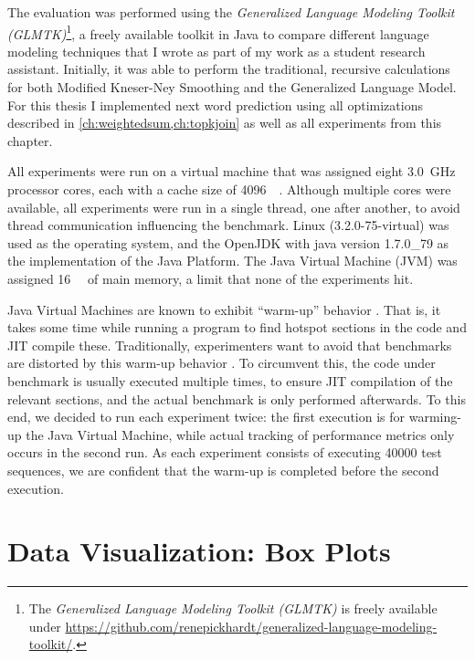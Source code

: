 The evaluation was performed using the \emph{Generalized Language Modeling
Toolkit (GLMTK)}\footnote{The \emph{Generalized Language Modeling Toolkit
(GLMTK)} is freely available under
\mbox{\url{https://github.com/renepickhardt/generalized-language-modeling-toolkit/}}.},
a freely available toolkit in Java to compare different language modeling
techniques that I wrote as part of my work as a student research assistant.
Initially, it was able to perform the traditional, recursive calculations for
both Modified Kneser-Ney Smoothing and the Generalized Language Model.
For this thesis I implemented next word prediction using all optimizations
described in \cref{ch:weightedsum,ch:topkjoin} as well as all experiments from
this chapter.

All experiments were run on a virtual machine that was assigned eight
\SI{3.0}{\giga\hertz} processor cores, each with a cache size of
\SI{4096}{\kibi\byte}.
Although multiple cores were available, all experiments were run in a single
thread, one after another, to avoid thread communication influencing the
benchmark.
Linux (3.2.0-75-virtual) was used as the operating system, and
the OpenJDK with java version 1.7.0\_79 as the implementation of the
Java Platform.
The Java Virtual Machine (JVM) was assigned \SI{16}{\gibi\byte} of main memory,
a limit that none of the experiments hit.

Java Virtual Machines are known to exhibit \enquote{warm-up} behavior \noref.
That is, it takes some time while running a program to find hotspot sections
in the code and JIT compile these.
Traditionally, experimenters want to avoid that benchmarks are distorted by
this warm-up behavior \noref.
To circumvent this, the code under benchmark is usually executed multiple times,
to ensure JIT compilation of the relevant sections, and the actual benchmark
is only performed afterwards.
To this end, we decided to run each experiment twice:
the first execution is for warming-up the Java Virtual Machine, while actual
tracking of performance metrics only occurs in the second run.
As each experiment consists of executing \num{40000} test sequences, we are
confident that the warm-up is completed before the second execution.


\section{Data Visualization: Box Plots}
\label{sec:boxplot}

